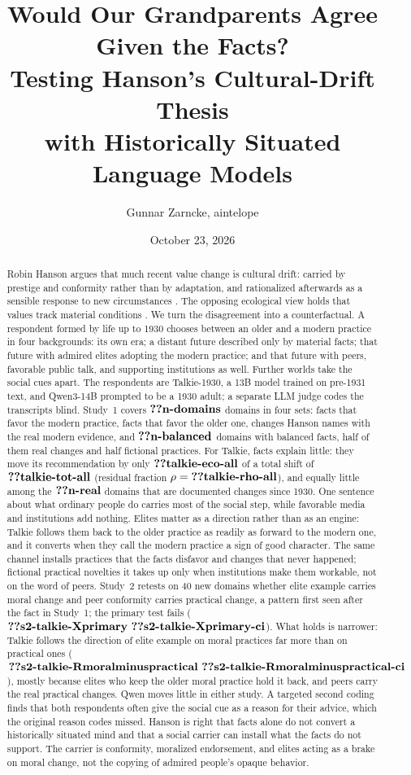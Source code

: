 \documentclass[11pt]{article}
\title{Would Our Grandparents Agree Given the Facts?\\
Testing Hanson's Cultural-Drift Thesis\\
with Historically Situated Language Models}
\author{Gunnar Zarncke, aintelope}
\date{October 23, 2026}
\makeatletter
\newcommand{\nv}[1]{\ifcsname n@#1\endcsname\csname n@#1\endcsname\else\textbf{??#1}\fi}
\newcommand{\nvc}[1]{\ensuremath{\nv{#1}\ \nv{#1-ci}}}
\makeatother
\begin{document}
\maketitle

\begin{abstract}
Robin Hanson argues that much recent value change is cultural drift: carried by prestige and conformity rather than by adaptation, and rationalized afterwards as a sensible response to new circumstances \cite{hanson2026,simler2018elephant}.
The opposing ecological view holds that values track material conditions \cite{inglehart2005modernization}.
We turn the disagreement into a counterfactual.
A respondent formed by life up to 1930 chooses between an older and a modern practice in four backgrounds: its own era; a distant future described only by material facts; that future with admired elites adopting the modern practice; and that future with peers, favorable public talk, and supporting institutions as well.
Further worlds take the social cues apart.
The respondents are Talkie-1930, a 13B model trained on pre-1931 text, and Qwen3-14B prompted to be a 1930 adult; a separate LLM judge codes the transcripts blind.
Study~1 covers $\nv{n-domains}$ domains in four sets: facts that favor the modern practice, facts that favor the older one, changes Hanson names with the real modern evidence, and $\nv{n-balanced}$ domains with balanced facts, half of them real changes and half fictional practices.
For Talkie, facts explain little: they move its recommendation by only $\nv{talkie-eco-all}$ of a total shift of $\nv{talkie-tot-all}$ (residual fraction $\rho=\nv{talkie-rho-all}$), and equally little among the $\nv{n-real}$ domains that are documented changes since 1930.
One sentence about what ordinary people do carries most of the social step, while favorable media and institutions add nothing.
Elites matter as a direction rather than as an engine: Talkie follows them back to the older practice as readily as forward to the modern one, and it converts when they call the modern practice a sign of good character.
The same channel installs practices that the facts disfavor and changes that never happened; fictional practical novelties it takes up only when institutions make them workable, not on the word of peers.
Study~2 retests on $40$ new domains whether elite example carries moral change and peer conformity carries practical change, a pattern first seen after the fact in Study~1; the primary test fails ($\nvc{s2-talkie-Xprimary}$).
What holds is narrower: Talkie follows the direction of elite example on moral practices far more than on practical ones ($\nvc{s2-talkie-Rmoralminuspractical}$), mostly because elites who keep the older moral practice hold it back, and peers carry the real practical changes.
Qwen moves little in either study.
A targeted second coding finds that both respondents often give the social cue as a reason for their advice, which the original reason codes missed.
Hanson is right that facts alone do not convert a historically situated mind and that a social carrier can install what the facts do not support.
The carrier is conformity, moralized endorsement, and elites acting as a brake on moral change, not the copying of admired people's opaque behavior.
\end{abstract}
\end{document}
